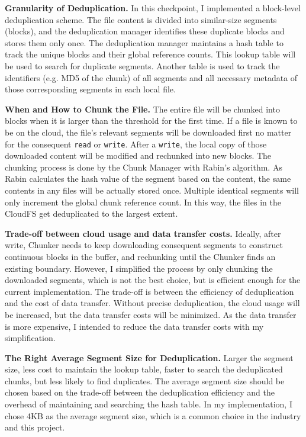 \documentclass[10pt]{article}
\begin{document}
\textbf{Granularity of Deduplication.} In this checkpoint, I implemented a block-level deduplication scheme. The file content is divided into similar-size segments (blocks), and the deduplication manager identifies these duplicate blocks and stores them only once.
The deduplication manager maintains a hash table to track the unique blocks and their global reference counts.
This lookup table will be used to search for duplicate segments.
Another table is used to track the identifiers (e.g. MD5 of the chunk) of all segments and all necessary metadata of those corresponding segments in each local file.

\textbf{When and How to Chunk the File.} The entire file will be chunked into blocks when it is larger than the threshold for the first time.
If a file is known to be on the cloud, the file's relevant segments will be downloaded first no matter for the consequent \texttt{read} or \texttt{write}.
After a \texttt{write}, the local copy of those downloaded content will be modified and rechunked into new blocks.
The chunking process is done by the Chunk Manager with Rabin's algorithm. As Rabin calculates the hash value of the segment based on the content, the same contents in any files will be actually stored once.
Multiple identical segments will only increment the global chunk reference count. In this way, the files in the CloudFS get deduplicated to the largest extent.

\textbf{Trade-off between cloud usage and data transfer costs.}
Ideally, after write, Chunker needs to keep downloading consequent segments to construct continuous blocks in the buffer, and rechunking until the Chunker finds an existing boundary.
However, I simplified the process by only chunking the downloaded segments,
which is not the best choice, but is efficient enough for the current implementation. The trade-off is between the efficiency of deduplication and the cost of data transfer.
Without precise deduplication, the cloud usage will be increased, but the data transfer costs will be minimized.
As the data transfer is more expensive, I intended to reduce the data transfer costs with my simplification.

\textbf{The Right Average Segment Size for Deduplication.}
Larger the segment size, less cost to maintain the lookup table, faster to search the deduplicated chunks, but less likely to find duplicates. The average segment size should be chosen based on the trade-off between the deduplication efficiency and the overhead of maintaining and searching the hash table. In my implementation, I chose 4KB as the average segment size, which is a common choice in the industry and this project.
\end{document}
